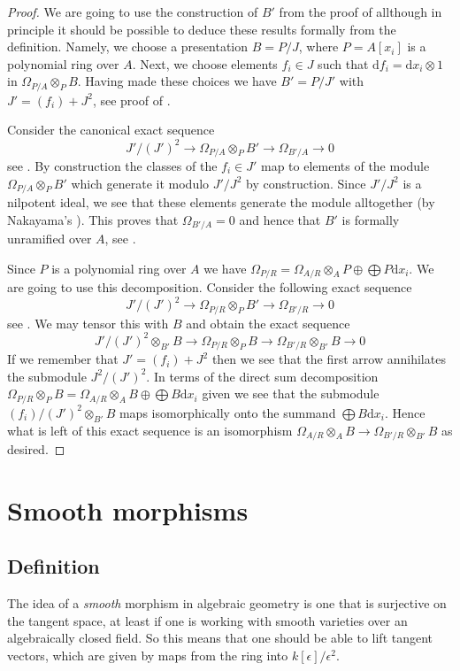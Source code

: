 \begin{proof}
We are going to use the construction of $B'$ from the proof of
allthough in principle it should be possible to deduce these results
formally from the definition. Namely, we choose a presentation
$B = P/J$, where $P = A[x_i]$ is a polynomial ring over $A$.
Next, we choose elements $f_i \in J$ such that
$\text{d}f_i = \text{d}x_i \otimes 1$ in $\Omega_{P/A} \otimes_P B$.
Having made these choices we have
$B' = P/J'$ with $J' = (f_i) + J^2$, see proof of
.

\medskip\noindent
Consider the canonical exact sequence
$$
J'/(J')^2 \to \Omega_{P/A} \otimes_P B' \to \Omega_{B'/A} \to 0
$$
see
.
By construction the classes of the $f_i \in J'$ map to elements of
the module $\Omega_{P/A} \otimes_P B'$ which generate it modulo
$J'/J^2$ by construction. Since $J'/J^2$ is a nilpotent ideal, we see
that these elements generate the module alltogether (by
Nakayama's ). This proves that $\Omega_{B'/A} = 0$
and hence that $B'$ is formally unramified over $A$, see
.

\medskip\noindent
Since $P$ is a polynomial ring over $A$ we have
$\Omega_{P/R} = \Omega_{A/R} \otimes_A P \oplus \bigoplus P\text{d}x_i$.
We are going to use this decomposition.
Consider the following exact sequence
$$
J'/(J')^2 \to
\Omega_{P/R} \otimes_P B' \to
\Omega_{B'/R} \to 0
$$
see
.
We may tensor this with $B$ and obtain the exact sequence
$$
J'/(J')^2 \otimes_{B'} B \to
\Omega_{P/R} \otimes_P B \to
\Omega_{B'/R} \otimes_{B'} B \to 0
$$
If we remember that $J' = (f_i) + J^2$
then we see that the first arrow annihilates the submodule $J^2/(J')^2$.
In terms of the direct sum decomposition
$\Omega_{P/R} \otimes_P B =
\Omega_{A/R} \otimes_A B \oplus \bigoplus B\text{d}x_i $ given
we see that the submodule $(f_i)/(J')^2 \otimes_{B'} B$ maps
isomorphically onto the summand $\bigoplus B\text{d}x_i$. Hence what is
left of this exact sequence is an isomorphism
$\Omega_{A/R} \otimes_A B \to \Omega_{B'/R} \otimes_{B'} B$
as desired.
\end{proof}


\section{Smooth morphisms}

\subsection{Definition}
The idea of a \emph{smooth} morphism in algebraic geometry is one that is
surjective on the tangent space, at least if one is working with smooth
varieties over an algebraically closed field. So this means that one should be
able to lift tangent vectors, which are given by maps from the ring into
$k[\epsilon]/\epsilon^2$.

